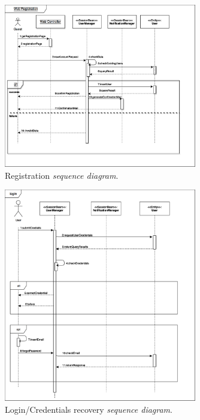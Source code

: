 \documentclass{article}
\begin{document}
	\bigskip
	\begin{figure}[!ht]
	\centering
	\includegraphics[width=0.75\textwidth]{img/diagrams/sd_registration.png}
	\caption{Registration \textit{sequence diagram}.}
	\end{figure}

	\newpage
	\begin{figure}[!ht]
	\centering
	\includegraphics[width=0.75\textwidth]{img/diagrams/sd_login.png}
	\caption{Login/Credentials recovery \textit{sequence diagram}.}
	\end{figure}
\end{document}

